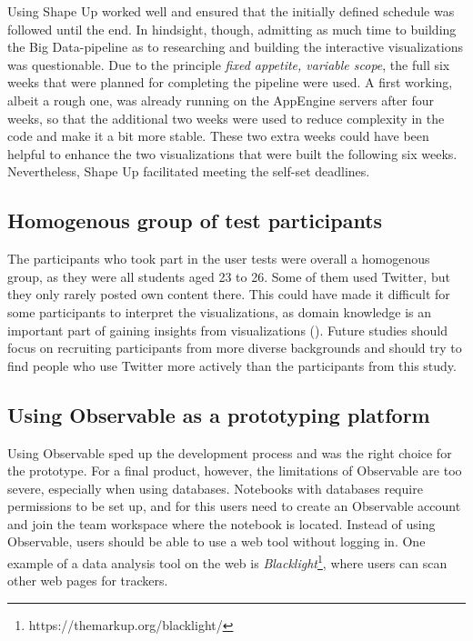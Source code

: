 Using Shape Up worked well and ensured that the initially defined schedule was followed until the end. In hindsight, though, admitting as much time to building the Big Data-pipeline as to researching and building the interactive visualizations was questionable. Due to the principle \emph{fixed appetite, variable scope}, the full six weeks that were planned for completing the pipeline were used. A first working, albeit a rough one, was already running on the AppEngine servers after four weeks, so that the additional two weeks were used to reduce complexity in the code and make it a bit more stable. These two extra weeks could have been helpful to enhance the two visualizations that were built the following six weeks. Nevertheless, Shape Up facilitated meeting the self-set deadlines.

\subsection*{Homogenous group of test participants}
The participants who took part in the user tests were overall a homogenous group, as they were all students aged 23 to 26. Some of them used Twitter, but they only rarely posted own content there. This could have made it difficult for some participants to interpret the visualizations, as domain knowledge is an important part of gaining insights from visualizations (\cite{northMeasuringVisualizationInsight2006}). Future studies should focus on recruiting participants from more diverse backgrounds and should try to find people who use Twitter more actively than the participants from this study.

\subsection*{Using Observable as a prototyping platform}
Using Observable sped up the development process and was the right choice for the prototype. For a final product, however, the limitations of Observable are too severe, especially when using databases. Notebooks with databases require permissions to be set up, and for this users need to create an Observable account and join the team workspace where the notebook is located. Instead of using Observable, users should be able to use a web tool without logging in. One example of a data analysis tool on the web is \emph{Blacklight}\footnote{https://themarkup.org/blacklight/}, where users can scan other web pages for trackers.

